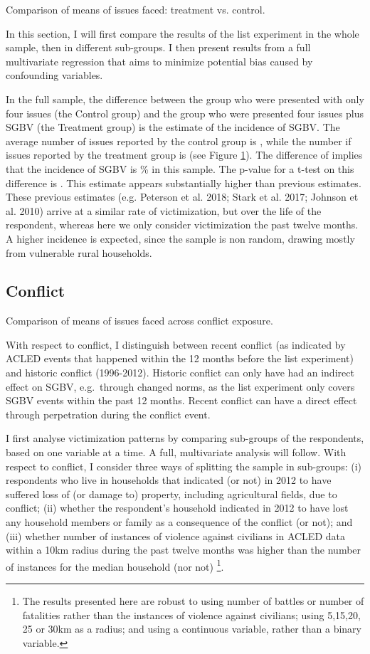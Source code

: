 \documentclass[
]{article}
\begin{document}
Comparison of means of issues faced: treatment vs. control.

In this section, I will first compare the results of the list experiment
in the whole sample, then in different sub-groups. I then present
results from a full multivariate regression that aims to minimize
potential bias caused by confounding variables.

In the full sample, the difference between the group who were presented
with only four issues (the Control group) and the group who were
presented four issues plus SGBV (the Treatment group) is the estimate of
the incidence of SGBV. The average number of issues reported by the
control group is , while the number if issues reported by the treatment
group is (see Figure \hyperref[fig:meancompare_overall]{1}). The
difference of implies that the incidence of SGBV is \% in this sample.
The p-value for a t-test on this difference is . This estimate appears
substantially higher than previous estimates. These previous estimates
(e.g. Peterson et al. 2018; Stark et al. 2017; Johnson et al. 2010)
arrive at a similar rate of victimization, but over the life of the
respondent, whereas here we only consider victimization the past twelve
months. A higher incidence is expected, since the sample is non random,
drawing mostly from vulnerable rural households.

\subsection*{Conflict}\label{conflict}

Comparison of means of issues faced across conflict exposure.

With respect to conflict, I distinguish between recent conflict (as
indicated by ACLED events that happened within the 12 months before the
list experiment) and historic conflict (1996-2012). Historic conflict
can only have had an indirect effect on SGBV, e.g.~through changed
norms, as the list experiment only covers SGBV events within the past 12
months. Recent conflict can have a direct effect through perpetration
during the conflict event.

I first analyse victimization patterns by comparing sub-groups of the
respondents, based on one variable at a time. A full, multivariate
analysis will follow. With respect to conflict, I consider three ways of
splitting the sample in sub-groups: (i) respondents who live in
households that indicated (or not) in 2012 to have suffered loss of (or
damage to) property, including agricultural fields, due to conflict;
(ii) whether the respondent's household indicated in 2012 to have lost
any household members or family as a consequence of the conflict (or
not); and (iii) whether number of instances of violence against
civilians in ACLED data within a 10km radius during the past twelve
months was higher than the number of instances for the median household
(nor not) \footnote{The results presented here are robust to using
  number of battles or number of fatalities rather than the instances of
  violence against civilians; using 5,15,20, 25 or 30km as a radius; and
  using a continuous variable, rather than a binary variable.}.
\end{document}
